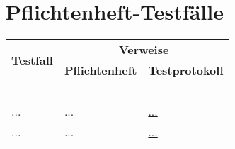 %



\newpage



\section{Pflichtenheft-Testfälle}
\label{Abschnitt:Tests:Protokoll:Pflichtenheft-Verweise}


\begin{longtable}{p{0.5\hsize}p{0.25\hsize}p{0.25\hsize}}


	    \multirow{2}{*}{\textbf{Testfall}}
	  & \multicolumn{2}{c}{\textbf{Verweise}}
	  
	  \\ [14pt]
	  
	  & {\centering \textbf{Pflichtenheft}}
	  & {\centering \textbf{Testprotokoll}}
	  
	  \\
	  
	     ~ & ~ & ~
	  
	  \\


	  ...
	& {\centering ...}
	& {\centering \href{}{...}}
	
	\\
	
	  ...
	& {\centering ...}
	& {\centering \href{}{...}}
	
	\\
	

\end{longtable}




